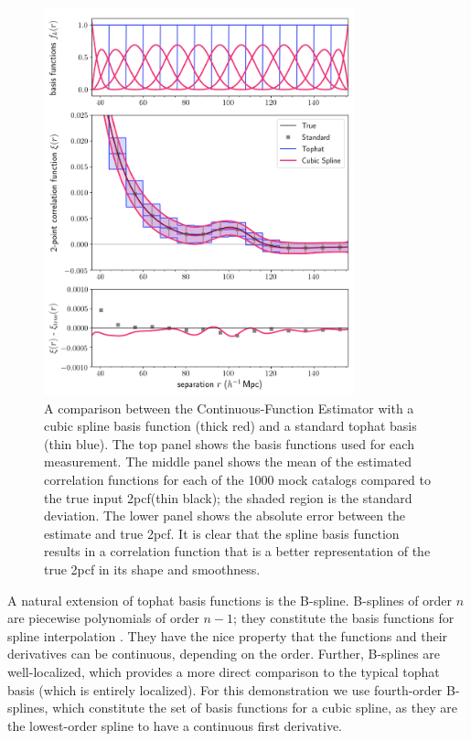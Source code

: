 \documentclass[modern]{aastex62}
\newcommand{\cf}{2pcf\xspace} %
\newcommand{\est}{the Continuous-Function Estimator\xspace}
\begin{document}
\begin{figure}[ht]

\centering
    \includegraphics[width=0.8\textwidth]{xicomparison_2e-4_tophat8_spline}
    \caption{A comparison between \est with a cubic spline basis function (thick red) and a standard tophat basis (thin blue). The top panel shows the basis functions used for each measurement. The middle panel shows the mean of the estimated correlation functions for each of the 1000 mock catalogs compared to the true input \cf (thin black); the shaded region is the standard deviation. The lower panel shows the absolute error between the estimate and true \cf. It is clear that the spline basis function results in a correlation function that is a better representation of the true \cf in its shape and smoothness.}
    \label{fig:spline}
\end{figure}

A natural extension of tophat basis functions is the B-spline.
B-splines of order $n$ are piecewise polynomials of order $n-1$; they constitute the basis functions for spline interpolation \citep{deBoor1987}.
They have the nice property that the functions and their derivatives can be continuous, depending on the order.
Further, B-splines are well-localized, which provides a more direct comparison to the typical tophat basis (which is entirely localized).
For this demonstration we use fourth-order B-splines, which constitute the set of basis functions for a cubic spline, as they are the lowest-order spline to have a continuous first derivative.
\end{document}
